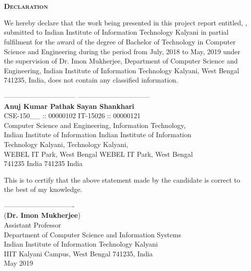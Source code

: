 \newpage
\chapter*{}
\begin{center}
\textbf{\textsc{\Large Declaration}}\\[0.75cm]
\end{center}

\onehalfspacing
We hereby declare that the work being presented in this project report entitled, \textbf{}, submitted to Indian Institute of Information Technology Kalyani in partial fulfilment for the award of the degree of Bachelor of Technology in Computer Science and Engineering during the period from July, 2018 to May, 2019 under the supervision of Dr. Imon Mukherjee, Department of Computer Science and Engineering, Indian Institute of Information Technology Kalyani, West Bengal 741235, India, does not contain any classified information.

\bigskip
\bigskip
\bigskip
\bigskip

\noindent
-------------------------------- \hfill -------------------------------- \\
\textbf{Anuj Kumar Pathak} \hfill \textbf{Sayan Shankhari} \\
CSE-150\_\_ :: 00000102 \hfill IT-15026 :: 00000121 \\
Computer Science and Engineering, \hfill Information Technology, \\
Indian Institute of Information \hfill Indian Institute of Information\\
Technology Kalyani, \hfill Technology Kalyani, \\
WEBEL IT Park, West Bengal \hfill WEBEL IT Park, West Bengal \\
741235 India \hfill 741235 India

\bigskip
\bigskip
\bigskip
This is to certify that the above statement made by the candidate is correct to the best of my knowledge.

\bigskip
\begin{flushleft}
\bigskip
\bigskip
------------------------------- \\
(\textbf{Dr. Imon Mukherjee}) \\
\smallskip
Assistant Professor \\
Department of Computer Science and Information Systems \\
Indian Institute of Information Technology Kalyani \\
IIIT Kalyani Campus, West Bengal 741235, India \\
May 2019 \\
\end{flushleft}

